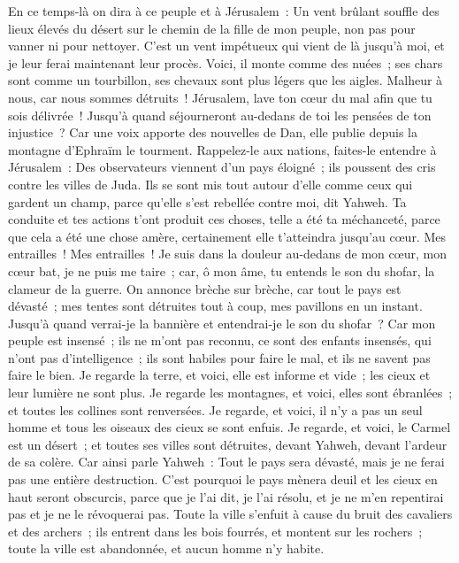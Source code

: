\begin{multicols}{2}
En ce temps-là on dira à ce peuple et à Jérusalem~: Un vent brûlant souffle des lieux élevés du désert sur le chemin de la fille de mon peuple, non pas pour vanner ni pour nettoyer.
C'est un vent impétueux qui vient de là jusqu'à moi, et je leur ferai maintenant leur procès.
Voici, il monte comme des nuées~; ses chars sont comme un tourbillon, ses chevaux sont plus légers que les aigles. Malheur à nous, car nous sommes détruits~!
Jérusalem, lave ton cœur du mal afin que tu sois délivrée~! Jusqu'à quand séjourneront au-dedans de toi les pensées de ton injustice~?
Car une voix apporte des nouvelles de Dan, elle publie depuis la montagne d'Ephraïm le tourment.
Rappelez-le aux nations, faites-le entendre à Jérusalem~: Des observateurs viennent d'un pays éloigné~; ils poussent des cris contre les villes de Juda.
Ils se sont mis tout autour d'elle comme ceux qui gardent un champ, parce qu'elle s'est rebellée contre moi, dit Yahweh.
Ta conduite et tes actions t'ont produit ces choses, telle a été ta méchanceté, parce que cela a été une chose amère, certainement elle t'atteindra jusqu'au cœur.
Mes entrailles~! Mes entrailles~! Je suis dans la douleur au-dedans de mon cœur, mon cœur bat, je ne puis me taire~; car, ô mon âme, tu entends le son du shofar, la clameur de la guerre.
On annonce brèche sur brèche, car tout le pays est dévasté~; mes tentes sont détruites tout à coup, mes pavillons en un instant.
Jusqu'à quand verrai-je la bannière et entendrai-je le son du shofar~?
Car mon peuple est insensé~; ils ne m'ont pas reconnu, ce sont des enfants insensés, qui n'ont pas d'intelligence~; ils sont habiles pour faire le mal, et ils ne savent pas faire le bien.
Je regarde la terre, et voici, elle est informe et vide~; les cieux et leur lumière ne sont plus.
Je regarde les montagnes, et voici, elles sont ébranlées~; et toutes les collines sont renversées.
Je regarde, et voici, il n'y a pas un seul homme et tous les oiseaux des cieux se sont enfuis.
Je regarde, et voici, le Carmel est un désert~; et toutes ses villes sont détruites, devant Yahweh, devant l'ardeur de sa colère.
Car ainsi parle Yahweh~: Tout le pays sera dévasté, mais je ne ferai pas une entière destruction.
C'est pourquoi le pays mènera deuil et les cieux en haut seront obscurcis, parce que je l'ai dit, je l'ai résolu, et je ne m'en repentirai pas et je ne le révoquerai pas.
Toute la ville s'enfuit à cause du bruit des cavaliers et des archers~; ils entrent dans les bois fourrés, et montent sur les rochers~; toute la ville est abandonnée, et aucun homme n'y habite.

\end{multicols}
